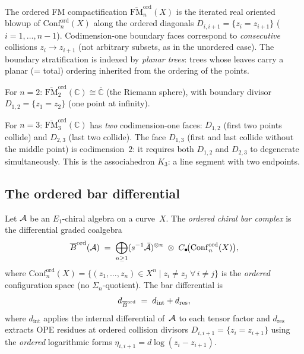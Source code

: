 \begin{construction}
\label{constr:ordered-fm}
The ordered FM compactification
$\overline{\mathrm{FM}}_n^{\mathrm{ord}}(X)$ is the
iterated real oriented blowup of
$\mathrm{Conf}_n^{\mathrm{ord}}(X)$ along the ordered
diagonals $D_{i,i+1}=\{z_i=z_{i+1}\}$ ($i=1,\dots,n-1$).
Codimension-one boundary faces correspond to
\emph{consecutive} collisions $z_i\to z_{i+1}$
(not arbitrary subsets, as in the unordered case).
The boundary stratification is indexed by
\emph{planar trees}: trees whose leaves carry a planar
(= total) ordering inherited from the ordering of the
points.

For $n=2$:
$\overline{\mathrm{FM}}_2^{\mathrm{ord}}(\mathbb C)
\cong\overline{\mathbb C}$ (the Riemann sphere), with
boundary divisor $D_{1,2}=\{z_1=z_2\}$ (one point at
infinity).

For $n=3$:
$\overline{\mathrm{FM}}_3^{\mathrm{ord}}(\mathbb C)$
has \emph{two} codimension-one faces: $D_{1,2}$ (first two
points collide) and $D_{2,3}$ (last two collide). The
face $D_{1,3}$ (first and last collide without the middle
point) is codimension~$2$: it requires both $D_{1,2}$
and $D_{2,3}$ to degenerate simultaneously. This is the
associahedron $K_3$: a line segment with two endpoints.
\end{construction}

\subsection{The ordered bar differential}
\label{subsec:ordered-bar-definition}

\begin{definition}
\label{def:ordered-chiral-bar}
Let $\mathcal{A}$ be an $E_1$-chiral algebra on a curve~$X$. The
\emph{ordered chiral bar complex} is the differential graded
coalgebra
\[
\overline{B}^{\mathrm{ord}}(\mathcal{A})
\;=\;
\bigoplus_{n\ge 1}
(s^{-1}\bar{\mathcal{A}})^{\otimes n}
\;\otimes\;
C_\bullet\!\bigl(\mathrm{Conf}_n^{\mathrm{ord}}(X)\bigr),
\]
where $\mathrm{Conf}_n^{\mathrm{ord}}(X)
=\{(z_1,\dots,z_n)\in X^n\mid z_i\neq z_j\;\forall\,i\neq j\}$
is the \emph{ordered} configuration space (no $\Sigma_n$-quotient).
The bar differential is
\[
d_{\overline{B}^{\mathrm{ord}}}
\;=\;
d_{\mathrm{int}}+d_{\mathrm{res}},
\]
where $d_{\mathrm{int}}$ applies the internal differential
of~$\mathcal{A}$ to each tensor factor and $d_{\mathrm{res}}$
extracts OPE residues at ordered collision divisors
$D_{i,i+1}=\{z_i=z_{i+1}\}$ using the \emph{ordered}
logarithmic forms $\eta_{i,i+1}=d\log(z_i-z_{i+1})$.

\end{definition}

